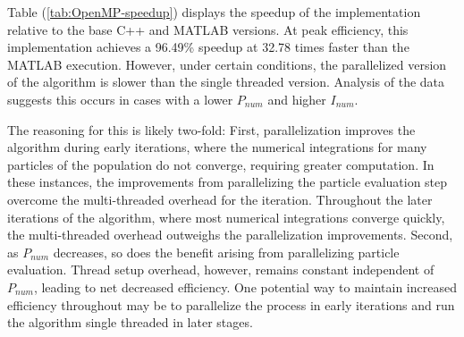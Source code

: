 \noindent Table (\ref{tab:OpenMP-speedup}) displays the speedup of the  
implementation relative to the base C++ and MATLAB versions. At peak efficiency, this implementation
achieves a 96.49\% speedup at 32.78 times faster than the MATLAB execution. However, under certain
conditions, the parallelized version of the algorithm is slower than the single threaded version. Analysis 
of the data suggests this occurs in cases with a lower $P_{num}$ and higher $I_{num}$. \newline

\noindent The reasoning for this
is likely two-fold: First, parallelization improves the algorithm during early iterations, where the numerical 
integrations for many particles of the population do not converge, requiring greater computation. In these 
instances, the improvements from parallelizing the particle evaluation step overcome the multi-threaded overhead
for the iteration. Throughout the later iterations of the algorithm, where most numerical integrations converge quickly,
the multi-threaded overhead outweighs the parallelization improvements. Second,
as $P_{num}$ decreases, so does the benefit arising from parallelizing particle evaluation. Thread setup
overhead, however, remains constant independent of $P_{num}$, leading to net decreased efficiency. One potential way 
to maintain increased efficiency throughout may be to parallelize the process in early iterations and run the algorithm
single threaded in later stages.

\newpage